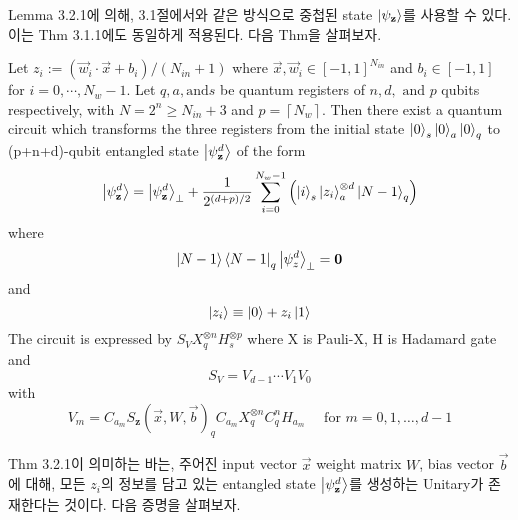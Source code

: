 Lemma 3.2.1에 의해, 3.1절에서와 같은 방식으로 중첩된 state \(\ket{\psi_{\mathbf z}}\)를 사용할 수 있다. 이는 Thm 3.1.1에도 동일하게 적용된다. 다음 Thm을 살펴보자.

\begin{theorem}
    Let \(z_i := \left( \vec{w}_i \cdot \vec{x} + b_i \right) / \left( N_{in} + 1 \right)\) where \(\vec{x}, \vec{w}_i \in [-1, 1]^{N_{in}}\) and \(b_i \in [-1, 1]\) for \(i = 0, \cdots, N_w - 1\). Let $q, a, \text{and} s$ be quantum registers of $n, d, \text{ and } p$ qubits respectively, with \( N = 2^n \ge N_{in} + 3 \) and \( p = \left\lceil N_{w} \right\rceil\). Then there exist a quantum circuit which transforms the three registers from the initial state \(\ket{0}_s \ket{0}_a \ket{0}_q\) to (p+n+d)-qubit entangled state \(\ket{\psi_{\mathbf z}^d}\) of the form
    \[
        \ket{\psi_{\mathbf z}^d} = \ket{\psi_{\mathbf z}^d}_{\perp} + {1 \over {2^{(d + p) / 2}}}\sum_{i=0}^{N_w - 1}\left( \ket{i}_{s} \ket{z_i}_{a}^{\otimes d} \ket{N-1}_q \right)
    \]
    where
    \[
        \ket{N-1}\bra{N-1}_q \ket{\psi_z^d}_{\perp} = \mathbf{0}
    \]
    and
    \[
        \ket{z_i} \equiv \ket{0} + z_i\ket{1}
    \]
    The circuit is expressed by $S_V X_q^{\otimes n} H_s^{\otimes p}$ where X is Pauli-X, H is Hadamard gate and
    \[
        S_V = V_{d-1} \cdots V_1 V_0
    \]
    with
    \[
        V_m = C_{a_m}S_{\mathbf{z}}(\vec{x}, W, \vec{b})_q C_{a_m}X^{\otimes n}_q C_q^nH_{a_m} \quad \text{ for } m = 0, 1, \dots, d - 1
    \]
\end{theorem}

Thm 3.2.1이 의미하는 바는, 주어진 input vector \(\vec x\) weight matrix \(W\), bias vector \(\vec b\)에 대해, 모든 \(z_i\)의 정보를 담고 있는 entangled state $\ket{\psi_{\mathbf z}^d}$를 생성하는 Unitary가 존재한다는 것이다. 다음 증명을 살펴보자.

